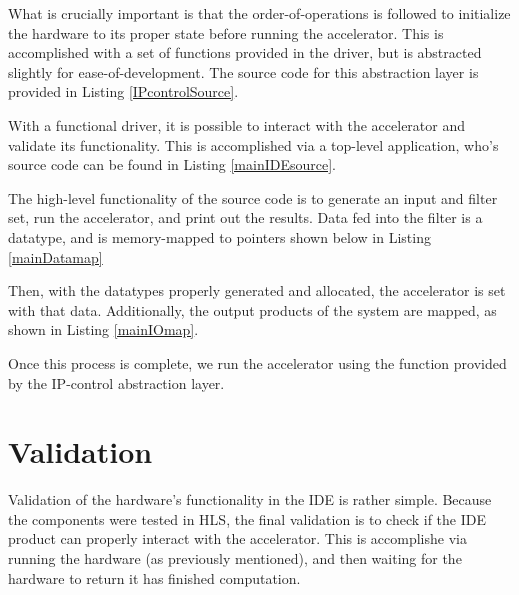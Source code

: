 \documentclass[11pt]{report}
\begin{document}
What is crucially important is that the order-of-operations is followed to initialize the hardware to its proper state before running the accelerator. This is accomplished with a set of functions provided in the driver, but is abstracted slightly for ease-of-development. The source code for this abstraction layer is provided in Listing \ref{IPcontrolSource}.

With a functional driver, it is possible to interact with the accelerator and validate its functionality. This is accomplished via a top-level application, who's source code can be found in Listing \ref{mainIDEsource}.

The high-level functionality of the source code is to generate an input and filter set, run the accelerator, and print out the results. Data fed into the filter is a  datatype, and is memory-mapped to pointers shown below in Listing \ref{mainDatamap}

	   \begin{singlespace}
            
        \end{singlespace} 
        
Then, with the datatypes properly generated and allocated, the accelerator is set with that data. Additionally, the output products of the system are mapped, as shown in Listing \ref{mainIOmap}.

	   \begin{singlespace}
            
        \end{singlespace} 
        
Once this process is complete, we run the accelerator using the  function provided by the IP-control abstraction layer.
        
 
\section{Validation}
       
Validation of the hardware's functionality in the IDE is rather simple. Because the components were tested in HLS, the final validation is to check if the IDE product can properly interact with the accelerator. This is accomplishe via running the hardware (as previously mentioned), and then waiting for the hardware to return it has finished computation. 
\end{document}

